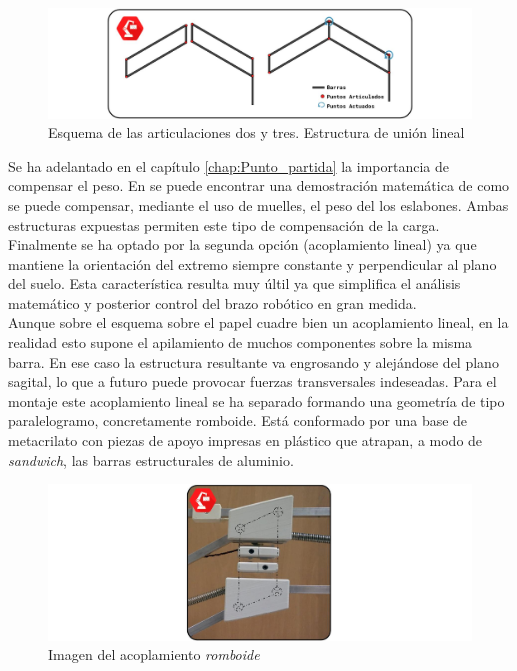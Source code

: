     \begin{figure}[H]
    	\centering
    	\includegraphics[width=\textwidth]{figuras/Imagenes_Mecanica/mecanismos_4_barras.jpg}
    	\caption{Esquema de las articulaciones dos y tres. Estructura de unión lineal}
    	\label{fig:Mecanica:4_bar_mecanism}
    \end{figure}

    Se ha adelantado en el capítulo \ref{chap:Punto_partida} la importancia de compensar el peso. En \cite{Rahman_asimple} se puede encontrar una demostración matemática de como se puede compensar, mediante el uso de muelles, el peso del los eslabones. Ambas estructuras expuestas permiten este tipo de compensación de la carga. Finalmente se ha optado por la segunda opción (acoplamiento lineal) ya que mantiene la orientación del extremo siempre constante y perpendicular al plano del suelo. Esta característica resulta muy últil ya que simplifica el análisis matemático y posterior control del brazo robótico en gran medida.
    \\

    Aunque sobre el esquema sobre el papel cuadre bien un acoplamiento lineal, en la realidad esto supone el apilamiento de muchos componentes sobre la misma barra. En ese caso la estructura resultante va engrosando y alejándose del plano sagital, lo que a futuro puede provocar fuerzas transversales indeseadas. Para el montaje este acoplamiento lineal se ha separado formando una geometría de tipo paralelogramo, concretamente romboide. Está conformado por una base de metacrilato con piezas de apoyo impresas en plástico que atrapan, a modo de \textit{sandwich}, las barras estructurales de aluminio.

    \begin{figure}[H]
        \centering
        \includegraphics[width=\textwidth]{figuras/Imagenes_Mecanica/acoplamiento_romboide.jpg}
        \caption{Imagen del acoplamiento \textit{romboide}}
        \label{fig:Mecanica:acoplamiento_romboide}
    \end{figure}

